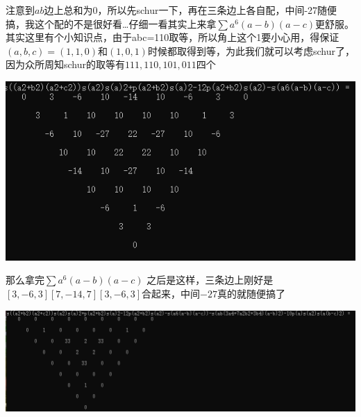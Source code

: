 \documentclass[UTF8]{ctexart}
\begin{document}
注意到$ ab $边上总和为0，所以先schur一下，再在三条边上各自配，中间-27随便搞，我这个配的不是很好看…仔细一看其实上来拿$  \displaystyle \sum a^{6}(a-b)(a-c) $更舒服。其实这里有个小知识点，由于abc=110取等，所以角上这个1要小心用，得保证$ (a,b,c)=(1,1,0) $和$ (1,0,1) $时候都取得到等，为此我们就可以考虑schur了，因为众所周知schur的取等有$ 111,110,101,011 $四个
\begin{center}
	\includegraphics[width=0.7\linewidth]{a04}
\end{center}
那么拿完$  \displaystyle \sum a^{6}(a-b)(a-c) $ 之后是这样，三条边上刚好是$ [3,-6,3][7,-14,7][3,-6,3] $合起来，中间$ -27 $真的就随便搞了
\begin{center}
	\includegraphics[width=0.9\linewidth]{a05}
\end{center}
\end{document}
